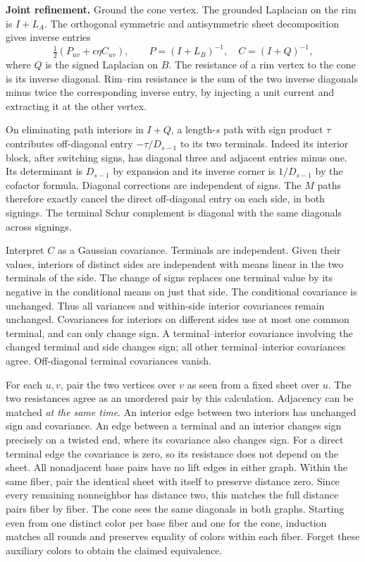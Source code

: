 \documentclass[10pt]{article}
\begin{document}
\textbf{Joint refinement.} Ground the cone vertex. The grounded Laplacian on the rim is $I+L_A$. The orthogonal symmetric and antisymmetric sheet decomposition gives inverse entries
\[
 \tfrac12(P_{uv}+\epsilon\eta C_{uv}),\qquad
 P=(I+L_B)^{-1},\quad C=(I+Q)^{-1},
\]
where $Q$ is the signed Laplacian on $B$. The resistance of a rim vertex to the cone is its inverse diagonal. Rim--rim resistance is the sum of the two inverse diagonals minus twice the corresponding inverse entry, by injecting a unit current and extracting it at the other vertex.

On eliminating path interiors in $I+Q$, a length-$s$ path with sign product $\tau$ contributes off-diagonal entry $-\tau/D_{s-1}$ to its two terminals. Indeed its interior block, after switching signs, has diagonal three and adjacent entries minus one. Its determinant is $D_{s-1}$ by expansion and its inverse corner is $1/D_{s-1}$ by the cofactor formula. Diagonal corrections are independent of signs. The $M$ paths therefore exactly cancel the direct off-diagonal entry on each side, in both signings. The terminal Schur complement is diagonal with the same diagonals across signings.

Interpret $C$ as a Gaussian covariance. Terminals are independent. Given their values, interiors of distinct sides are independent with means linear in the two terminals of the side. The change of signs replaces one terminal value by its negative in the conditional means on just that side. The conditional covariance is unchanged. Thus all variances and within-side interior covariances remain unchanged. Covariances for interiors on different sides use at most one common terminal, and can only change sign. A terminal--interior covariance involving the changed terminal and side changes sign; all other terminal--interior covariances agree. Off-diagonal terminal covariances vanish.

For each $u,v$, pair the two vertices over $v$ as seen from a fixed sheet over $u$. The two resistances agree as an unordered pair by this calculation. Adjacency can be matched \emph{at the same time}. An interior edge between two interiors has unchanged sign and covariance. An edge between a terminal and an interior changes sign precisely on a twisted end, where its covariance also changes sign. For a direct terminal edge the covariance is zero, so its resistance does not depend on the sheet. All nonadjacent base pairs have no lift edges in either graph. Within the same fiber, pair the identical sheet with itself to preserve distance zero. Since every remaining nonneighbor has distance two, this matches the full distance pairs fiber by fiber. The cone sees the same diagonals in both graphs. Starting even from one distinct color per base fiber and one for the cone, induction matches all rounds and preserves equality of colors within each fiber. Forget these auxiliary colors to obtain the claimed equivalence.
\end{document}
